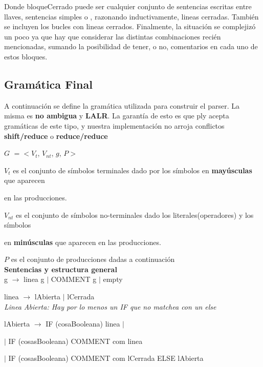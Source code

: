 Donde bloqueCerrado puede ser cualquier conjunto de sentencias escritas entre llaves, sentencias simples o , razonando inductivamente, lineas cerradas. También se incluyen los bucles con lineas cerrados. Finalmente, la situación se complejizó un poco ya que hay que considerar las distintas combinaciones recién mencionadas, sumando la posibilidad de tener, o no, comentarios en cada uno de estos bloques.


\subsection{Gramática Final}
A continuación se define la gramática utilizada para construir el parser. La misma es \textbf{no ambigua} y \textbf{LALR}. La garantía de esto es que ply acepta gramáticas de este tipo, y nuestra implementación no arroja conflictos \textbf{shift/reduce} o \textbf{reduce/reduce} \\

\linespread{1.125}\selectfont

$G$ $=<V_{t}$, $V_{nt}$, $g$, $P>$

$V_{t}$ es el conjunto de símbolos terminales dado por los símbolos en \textbf{mayúsculas} que aparecen 

en las producciones.


$V_{nt}$ es el conjunto de símbolos no-terminales dado los literales(operadores) y los símbolos

en \textbf{minúsculas} que aparecen en las producciones.



$P$ es el conjunto de producciones dadas a continuación\\


\textbf{Sentencias y estructura general} \\

g $\rightarrow$ linea g $|$ COMMENT g $|$ empty 

linea $\rightarrow$ lAbierta $|$ lCerrada \\


\textit{Linea Abierta: Hay por lo menos un IF que no matchea con un else} 

lAbierta $\rightarrow$ IF (cosaBooleana) linea $|$

\hspace{15mm}$|$ IF (cosasBooleana) COMMENT com linea 

\hspace{15mm}$|$ IF (cosasBooleana) COMMENT com lCerrada ELSE lAbierta 

